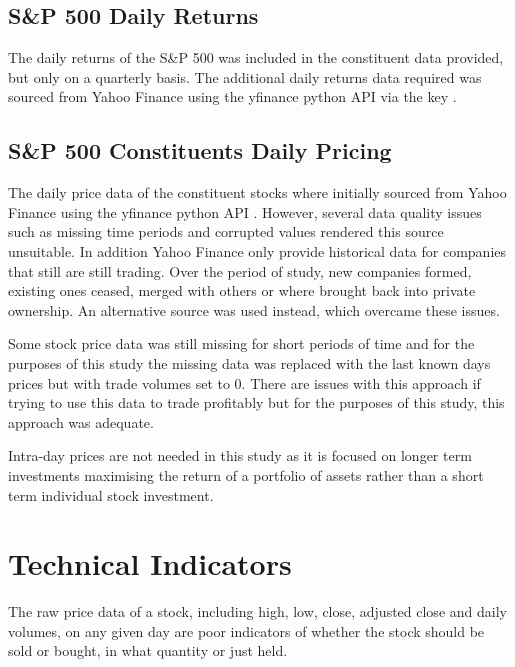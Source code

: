 \documentclass[oneside,12pt]{Classes/RoboticsLaTeX}
\begin{document}
\subsection{S\&P 500 Daily Returns}
The daily returns of the S\&P 500 was included in the constituent data provided,  but only on a quarterly basis. The additional daily returns data required was sourced from Yahoo Finance \citep{YahooFinance} using the yfinance python API \citep{Ranaroussi2019} via the key . 
\subsection{S\&P 500 Constituents Daily Pricing}
The daily price data of the constituent stocks where initially sourced from Yahoo Finance \citep{YahooFinance} using the yfinance python API \citep{Ranaroussi2019}. However, several data quality issues such as missing time periods and corrupted values rendered this source unsuitable. In addition Yahoo Finance only provide historical data for companies that still are still trading. Over the period of study, new companies formed, existing ones ceased, merged with others or where brought back into private ownership. An alternative source was used instead, \citet{SimFin2020} which overcame these issues.

Some stock price data was still missing for short periods of time and for the purposes of this study the missing data was replaced with the last known days prices but with trade volumes set to 0.  There are issues with this approach if trying to use this data to trade profitably but for the purposes of this study, this approach was adequate.

Intra-day prices are not needed in this study as  it is focused on longer term investments maximising the return of a portfolio of assets rather than a short term  individual stock investment.
\section{Technical Indicators} \label{section:technical indicators}
The raw price data of a stock, including high, low, close, adjusted close and daily volumes, on any given day are poor indicators of whether the stock should be sold or bought, in what quantity or just held. 
\end{document}
